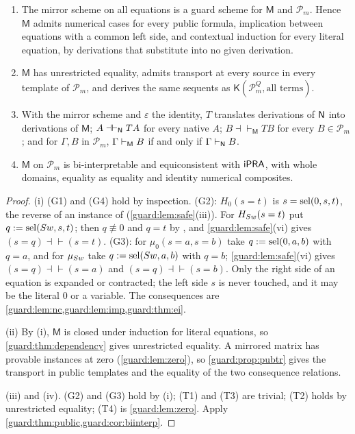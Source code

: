 \begin{theorem}
\label{guard:thm:mirror}
\begin{enumerate}[label=\textup{(\roman*)}]
\item The mirror scheme on all equations is a guard scheme for $\mathsf M$
 and $\mathcal P_m$.  Hence $\mathsf M$ admits numerical cases for every
 public formula, implication between equations with a common left side, and
 contextual induction for every literal equation, by derivations that
 substitute into no given derivation.
\item $\mathsf M$ has unrestricted equality, admits transport at every
 source in every template of $\mathcal P_m$, and derives the same sequents
 as $\mathsf K(\mathcal P_m^{Q},\text{all terms})$.
\item With the mirror scheme and $\varepsilon$ the identity, $T$ translates
 derivations of $\mathsf{N}$ into derivations of $\mathsf M$;
 $A\dashv\vdash_{\mathsf{N}}TA$ for every native $A$;
 $B\dashv\vdash_{\mathsf M}TB$ for every $B\in\mathcal P_m$; and for
 $\Gamma,B$ in $\mathcal P_m$, $\Gamma\vdash_{\mathsf M}B$ if and only if
 $\Gamma\vdash_{\mathsf{N}}B$.
\item $\mathsf M$ on $\mathcal P_m$ is bi-interpretable and equiconsistent
 with $\mathsf{iPRA}$, with whole domains, equality as equality and identity
 numerical composites.
\end{enumerate}
\end{theorem}

\begin{proof}
(i) (G1) and (G4) hold by inspection.  (G2): $H_0(s=t)$ is
$s=\operatorname{sel}(0,s,t)$, the reverse of an instance of 
(\cref{guard:lem:safe}(iii)).  For $H_{S w}(s=t)$ put
$q\mathrel{:=}\operatorname{sel}(S w,s,t)$; then $q\not\equiv 0$ and $q=t$ by
, and \cref{guard:lem:safe}(vi) gives
$(s=q)\dashv\vdash(s=t)$.  (G3): for $\mu_0(s=a,s=b)$ take
$q\mathrel{:=}\operatorname{sel}(0,a,b)$ with $q=a$, and for $\mu_{S w}$ take
$q\mathrel{:=}\operatorname{sel}(S w,a,b)$ with $q=b$; \cref{guard:lem:safe}(vi) gives
$(s=q)\dashv\vdash(s=a)$ and $(s=q)\dashv\vdash(s=b)$.  Only the right side
of an equation is expanded or contracted; the left side $s$ is never
touched, and it may be the literal $0$ or a variable.  The consequences are
\cref{guard:lem:nc,guard:lem:imp,guard:thm:ei}.

(ii) By (i), $\mathsf M$ is closed under induction for literal equations,
so \cref{guard:thm:dependency} gives unrestricted equality.  A mirrored
matrix has provable instances at zero (\cref{guard:lem:zero}), so
\cref{guard:prop:pubtr} gives the transport in public templates and the
equality of the two consequence relations.

(iii) and (iv).  (G2) and (G3) hold by (i); (T1) and (T3) are trivial; (T2)
holds by unrestricted equality; (T4) is \cref{guard:lem:zero}.  Apply
\cref{guard:thm:public,guard:cor:biinterp}.
\end{proof}

